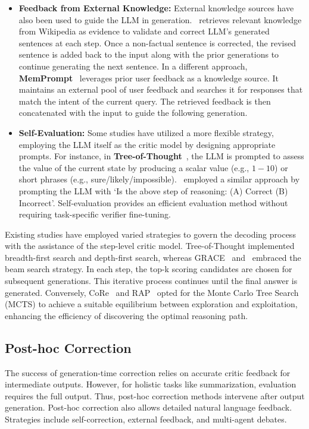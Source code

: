 \documentclass[12pt]{extarticle}
\begin{document}
\begin{itemize}
    \item \textbf{Feedback from External Knowledge:} External knowledge sources have also been used to guide the LLM in generation.~\cite{varshney2023stitch} retrieves relevant knowledge from Wikipedia as evidence to validate and correct LLM's generated sentences at each step. Once a non-factual sentence is corrected, the revised sentence is added back to the input along with the prior generations to continue generating the next sentence. In a different approach, \textbf{MemPrompt}~\cite{madaan-etal-2022-memory} leverages prior user feedback as a knowledge source. It maintains an external pool of user feedback and searches it for responses that match the intent of the current query. The retrieved feedback is then concatenated with the input to guide the following generation.

    \item \textbf{Self-Evaluation:} Some studies have utilized a more flexible strategy, employing the LLM itself as the critic model by designing appropriate prompts. For instance, in \textbf{Tree-of-Thought}~\cite{yao2023tree}, the LLM is prompted to assess the value of the current state by producing a scalar value (e.g., $1-10$) or short phrases (e.g., sure/likely/impossible).~\cite{xie2023selfevaluation} employed a similar approach by prompting the LLM with `Is the above step of reasoning: (A) Correct (B) Incorrect'. Self-evaluation provides an efficient evaluation method without requiring task-specific verifier fine-tuning.
\end{itemize}

Existing studies have employed varied strategies to govern the decoding process with the assistance of the step-level critic model. Tree-of-Thought implemented breadth-first search and depth-first search, whereas GRACE~\cite{khalifa2023grace} and~\cite{xie2023selfevaluation} embraced the beam search strategy. In each step, the top-k scoring candidates are chosen for subsequent generations. This iterative process continues until the final answer is generated. Conversely, CoRe~\cite{zhu-etal-2023-solving} and RAP~\cite{hao2023reasoning} opted for the Monte Carlo Tree Search (MCTS) to achieve a suitable equilibrium between exploration and exploitation, enhancing the efficiency of discovering the optimal reasoning path.

\subsection{Post-hoc Correction}
The success of generation-time correction relies on accurate critic feedback for intermediate outputs. However, for holistic tasks like summarization, evaluation requires the full output. Thus, post-hoc correction methods intervene after output generation. Post-hoc correction also allows detailed natural language feedback. Strategies include self-correction, external feedback, and multi-agent debates.
\end{document}
